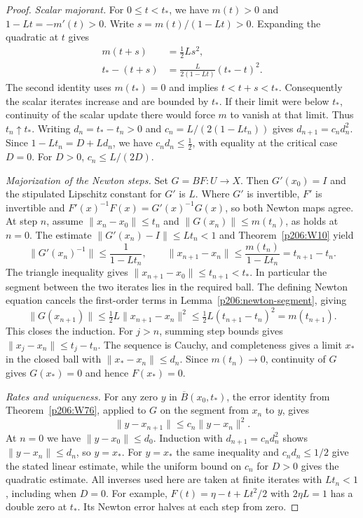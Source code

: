 \documentclass[11pt,oneside,openany]{book}
\theoremstyle{plain}
\theoremstyle{definition}
\theoremstyle{remark}
\begin{document}
\begin{proof}
\emph{Scalar majorant.}
For \(0\le t<t_*\), we have \(m(t)>0\) and \(1-Lt=-m'(t)>0\).
Write \(s=m(t)/(1-Lt)>0\). Expanding the quadratic at \(t\) gives
\[
 \begin{split}
 m(t+s)&=\tfrac12 Ls^2,\\
 t_*-(t+s)&=\frac{L}{2(1-Lt)}(t_*-t)^2 .
 \end{split}
\]
The second identity uses \(m(t_*)=0\) and implies \(t<t+s<t_*\).
Consequently the scalar iterates increase and are bounded by \(t_*\).
If their limit were below \(t_*\), continuity of the scalar update
there would force \(m\) to vanish at that limit. Thus \(t_n\uparrow t_*\).
Writing \(d_n=t_*-t_n>0\) and
\(c_n=L/(2(1-Lt_n))\) gives \(d_{n+1}=c_n d_n^2\).
Since \(1-Lt_n=D+Ld_n\), we have
\(c_nd_n\le\tfrac12\), with equality at the critical case \(D=0\).
For \(D>0\), \(c_n\le L/(2D)\).

\emph{Majorization of the Newton steps.}
Set \(G=BF\colon U\to X\). Then \(G'(x_0)=I\) and the stipulated
Lipschitz constant for \(G'\) is \(L\).
Where \(G'\) is invertible, \(F'\) is invertible and
\(F'(x)^{-1}F(x)=G'(x)^{-1}G(x)\), so both Newton maps agree.
At step \(n\), assume
\(\|x_n-x_0\|\le t_n\) and \(\|G(x_n)\|\le m(t_n)\), as holds at
\(n=0\). The estimate
\(\|G'(x_n)-I\|\le Lt_n<1\) and Theorem~\ref{p206:W10} yield
\[
 \|G'(x_n)^{-1}\|\le\frac1{1-Lt_n},\qquad
 \|x_{n+1}-x_n\|\le\frac{m(t_n)}{1-Lt_n}=t_{n+1}-t_n .
\]
The triangle inequality gives
\(\|x_{n+1}-x_0\|\le t_{n+1}<t_*\). In particular the segment between
the two iterates lies in the required ball. The defining Newton
equation cancels the first-order terms in
Lemma~\ref{p206:newton-segment}, giving
\[
 \|G(x_{n+1})\|
 \le \tfrac12 L\|x_{n+1}-x_n\|^2
 \le \tfrac12 L(t_{n+1}-t_n)^2
 = m(t_{n+1}).
\]
This closes the induction. For \(j>n\), summing step bounds
gives \(\|x_j-x_n\|\le t_j-t_n\). The sequence is Cauchy, and
completeness gives a limit \(x_*\) in the closed ball with
\(\|x_*-x_n\|\le d_n\). Since \(m(t_n)\to0\), continuity of \(G\)
gives \(G(x_*)=0\) and hence \(F(x_*)=0\).

\emph{Rates and uniqueness.}
For any zero \(y\) in \(\overline B(x_0,t_*)\), the error identity
from Theorem~\ref{p206:W76}, applied to \(G\) on the segment from
\(x_n\) to \(y\), gives
\[
 \|y-x_{n+1}\|\le c_n\|y-x_n\|^2 .
\]
At \(n=0\) we have \(\|y-x_0\|\le d_0\).
Induction with \(d_{n+1}=c_nd_n^2\) shows \(\|y-x_n\|\le d_n\),
so \(y=x_*\). For \(y=x_*\) the same inequality and
\(c_nd_n\le1/2\) give the stated linear estimate, while the uniform
bound on \(c_n\) for \(D>0\) gives the quadratic estimate.
All inverses used here are taken at finite iterates with
\(Lt_n<1\), including when \(D=0\). For example,
\(F(t)=\eta-t+Lt^2/2\) with \(2\eta L=1\) has a double zero at
\(t_*\). Its Newton error halves at each step from zero.


\end{proof}
\end{document}
